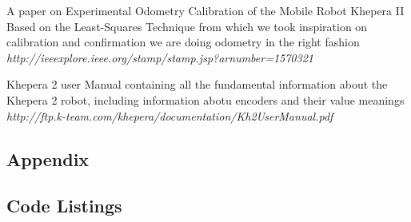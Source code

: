 \documentclass[11pt, a4paper]{article}
\begin{document}
\begin{thebibliography}{8}
\par{A paper on Experimental Odometry Calibration of the Mobile Robot Khepera II Based on the Least-Squares Technique from which we took inspiration on calibration and confirmation we are doing odometry in the right fashion} \\
\textit{http://ieeexplore.ieee.org/stamp/stamp.jsp?arnumber=1570321}


\par{Khepera 2 user Manual containing all the fundamental information about the Khepera 2 robot, including information abotu encoders and their value meanings} \\
\textit{http://ftp.k-team.com/khepera/documentation/Kh2UserManual.pdf}







\end{thebibliography}


\begin{appendices}
\section*{Appendix}
\subsection{Code Listings}









\end{appendices}
\end{document}
